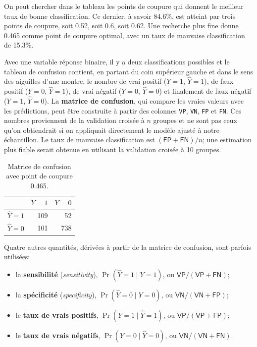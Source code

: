 \documentclass[
  11pt,
  letterpaper,
]{scrbook}
\providecommand{\tightlist}{%
  \setlength{\itemsep}{0pt}\setlength{\parskip}{0pt}}\usepackage{longtable,booktabs,array}
\theoremstyle{definition}
\theoremstyle{remark}
\begin{document}
On peut chercher dans le tableau les points de coupure qui donnent le
meilleur taux de bonne classification. Ce dernier, à savoir 84.6\%, est
atteint par trois points de coupure, soit 0.52, soit 0.6, soit 0.62. Une
recherche plus fine donne 0.465 comme point de coupure optimal, avec un
taux de mauvaise classification de 15.3\%.

Avec une variable réponse binaire, il y a deux classifications possibles
et le tableau de confusion contient, en partant du coin supérieur gauche
et dans le sens des aiguilles d'une montre, le nombre de vrai positif
(\(Y=1\), \(\widehat{Y}=1\)), de faux positif (\(Y=0\),
\(\widehat{Y}=1\)), de vrai négatif (\(Y=0\), \(\widehat{Y}=0\)) et
finalement de faux négatif (\(Y=1\), \(\widehat{Y}=0\)). La
\textbf{matrice de confusion}, qui compare les vraies valeurs avec les
prédictions, peut être construite à partir des colonnes \texttt{VP},
\texttt{VN}, \texttt{FP} et \texttt{FN}. Ces nombres proviennent de la
validation croisée à \(n\) groupes et ne sont pas ceux qu'on obtiendrait
si on appliquait directement le modèle ajusté à notre échantillon. Le
taux de mauvaise classification est \((\mathsf{FP}+\mathsf{FN})/n\); une
estimation plus fiable serait obtenue en utilisant la validation croisée
à 10 groupes.

\begin{longtable}[]{@{}lrr@{}}

\caption{\label{tbl-confumat}Matrice de confusion avec point de coupure
0.465.}

\tabularnewline

\toprule\noalign{}
& \(Y=1\) & \(Y=0\) \\
\midrule\noalign{}
\endhead
\bottomrule\noalign{}
\endlastfoot
\(\widehat{Y}=1\) & 109 & 52 \\
\(\widehat{Y}=0\) & 101 & 738 \\

\end{longtable}

Quatre autres quantités, dérivées à partir de la matrice de confusion,
sont parfois utilisées:

\begin{itemize}
\tightlist
\item
  la \textbf{sensibilité} (\emph{sensitivity}),
  \(\Pr(\widehat{Y}=1 \mid Y=1)\), ou
  \(\mathsf{VP}/(\mathsf{VP}+\mathsf{FN})\);
\item
  la \textbf{spécificité} (\emph{specificity}),
  \(\Pr(\widehat{Y}=0 \mid Y=0)\), ou
  \(\mathsf{VN}/(\mathsf{VN}+\mathsf{FP})\);
\item
  le \textbf{taux de vrais positifs}, \(\Pr(Y=1 \mid \widehat{Y}=1)\),
  ou \(\mathsf{VP}/(\mathsf{VP}+\mathsf{FP})\);
\item
  le \textbf{taux de vrais négatifs}, \(\Pr(Y=0 \mid \widehat{Y}=0)\),
  ou \(\mathsf{VN}/(\mathsf{VN}+\mathsf{FN})\).
\end{itemize}
\end{document}
